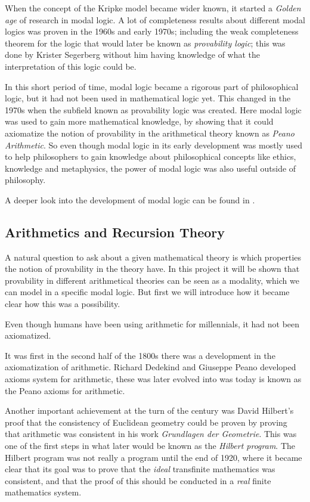 \documentclass[../main.tex]{subfiles}
\begin{document}
When the concept of the Kripke model became wider known, it started a
\textit{Golden age} of research in modal logic. A lot of completeness results
about different modal logics was proven in the 1960s and early 1970s; including
the weak completeness theorem for the logic that would later be known as
\textit{provability logic}; this was done by Krister Segerberg 
\parencite{Sgerberg1971} without him having
knowledge of what the interpretation of this logic could be.

In this short period of time, modal logic became a rigorous part of
philosophical logic, but it had not been used in mathematical logic yet. This
changed in the 1970s when the subfield known as provability logic was created.
Here modal logic was used to gain more mathematical knowledge, by showing that
it could axiomatize the notion of provability in the arithmetical theory known
as \textit{Peano Arithmetic}. So even though modal logic in its early development was
mostly used to help philosophers to gain knowledge about philosophical concepts
like ethics, knowledge and metaphysics, the power of modal logic was also
useful outside of philosophy.

A deeper look into the development of modal logic can be found in
\citet{Goldblatt2003}.
\subsection{Arithmetics and Recursion Theory}
A natural question to ask about a given mathematical theory is which properties
the notion of provability in the theory have. In this project it will be shown
that provability in different arithmetical theories  can be seen as a modality,
which we can model in a specific
modal logic. But first we will introduce how it became clear how this was a
possibility.

Even though humans have been using arithmetic for millennials, it had not been
axiomatized.

It was first in  the second half of the 1800s there was a development in the axiomatization
of arithmetic. Richard Dedekind and Giuseppe Peano developed axioms system for arithmetic,
these was later evolved into was today is known as the Peano axioms for
arithmetic. 

Another important achievement at the turn of the century was David Hilbert's
proof that the consistency of Euclidean geometry could be proven by proving
that arithmetic was consistent in his work  \textit{Grundlagen der Geometrie}.
This was one of the first steps in what later
would be known as the \textit{Hilbert program}. 
The Hilbert program was not really a program until the end of 1920, where it
became clear that its goal was to prove that the \textit{ideal} transfinite mathematics was
consistent, and that the proof of this should be conducted in a \textit{real}
finite mathematics system.
\end{document}
